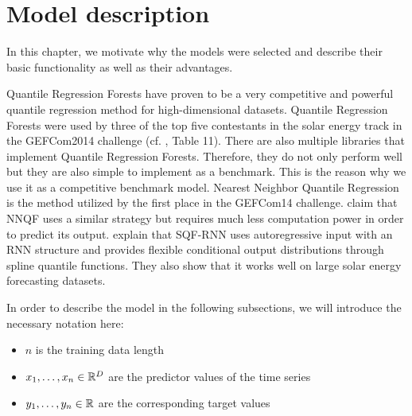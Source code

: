 \chapter{Model description}
\label{ch:model-description}

In this chapter, we motivate why the models were selected and 
describe their basic functionality as well as their advantages.

Quantile Regression Forests have proven to be a very competitive 
and powerful quantile regression method for high-dimensional datasets. 
Quantile Regression Forests were used by three of the top five contestants 
in the solar energy track in the GEFCom2014 challenge (cf. \Textcite{Hong2016}, Table 11). 
There are also multiple libraries that implement Quantile Regression Forests.
Therefore, they do not only perform 
well but they are also simple to implement as a benchmark.
This is the reason why we use it as a competitive benchmark model.
Nearest Neighbor Quantile Regression is the method utilized by the first place 
in the GEFCom14 challenge. \Textcite{Ordiano2019} claim that NNQF uses a similar strategy but requires much less 
computation power in order to predict its output. 
\Textcite{Gasthaus2019} explain that SQF-RNN uses autoregressive input with an RNN structure and provides flexible 
conditional output distributions through spline quantile functions. 
They also show that it works well on large solar energy 
forecasting datasets.

In order to describe the model in the following subsections, we will introduce the necessary notation here:
\begin{itemize}
    \item \(n\) is the training data length
    \item \(x_1, \ldots, x_n \in \mathbb{R}^D\) are the predictor values of the time series
    \item \(y_1, \ldots, y_n \in \mathbb{R}\) are the corresponding target values
\end{itemize}





